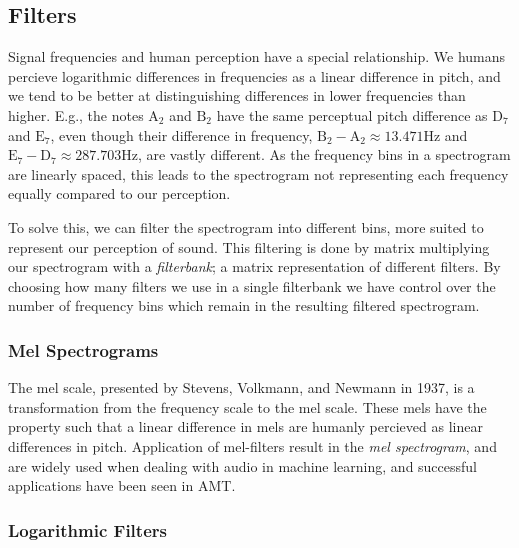 \subsection{Filters}

Signal frequencies and human perception have a special relationship. We humans percieve logarithmic differences in frequencies as a linear difference in pitch, and we tend to be better at distinguishing differences in lower frequencies than higher. E.g., the notes $\text{A}_2$ and $\text{B}_2$ have the same perceptual pitch difference as $\text{D}_7$ and $\text{E}_7$, even though their difference in frequency, $\text{B}_2 - \text{A}_2 \approx 13.471 \text{Hz}$ and $\text{E}_7 - \text{D}_7 \approx 287.703 \text{Hz}$, are vastly different. As the frequency bins in a spectrogram are linearly spaced, this leads to the spectrogram not representing each frequency equally compared to our perception.

To solve this, we can filter the spectrogram into different bins, more suited to represent our perception of sound. This filtering is done by matrix multiplying our spectrogram with a \textit{filterbank}; a matrix representation of different filters. By choosing how many filters we use in a single filterbank we have control over the number of frequency bins which remain in the resulting filtered spectrogram.

\subsubsection{Mel Spectrograms}

The mel scale, presented by Stevens, Volkmann, and Newmann in 1937, is a transformation from the frequency scale to the mel scale. These mels have the property such that a linear difference in mels are humanly percieved as linear differences in pitch. Application of mel-filters result in the \textit{mel spectrogram}, and are widely used when dealing with audio in machine learning, and successful applications have been seen in \gls{AMT}.~\cite{wolfmonheim2024spectralrhythmfeaturesaudio, gardner2022mt3multitaskmultitrackmusic, chang2024yourmt3+, 8350302, gong2021astaudiospectrogramtransformer, zehren2024analyzingreducingsynthetictorealtransfer}

\subsubsection{Logarithmic Filters}

